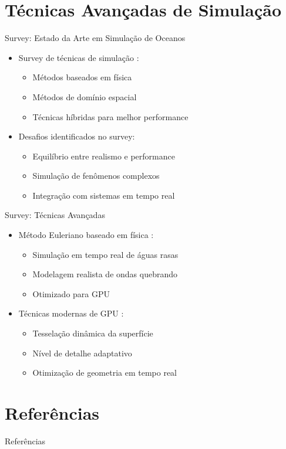 \documentclass[aspectratio=169,xcolor=table]{beamer}
\begin{document}
\section{Técnicas Avançadas de Simulação}
\begin{frame}{Survey: Estado da Arte em Simulação de Oceanos}
    \begin{itemize}
        \item Survey de técnicas de simulação \cite{darles2011survey}:
        \begin{itemize}
            \item Métodos baseados em física
            \item Métodos de domínio espacial
            \item Técnicas híbridas para melhor performance
        \end{itemize}
        \item Desafios identificados no survey:
        \begin{itemize}
            \item Equilíbrio entre realismo e performance
            \item Simulação de fenômenos complexos
            \item Integração com sistemas em tempo real
        \end{itemize}
    \end{itemize}
\end{frame}

\begin{frame}{Survey: Técnicas Avançadas}
    \begin{itemize}
        \item Método Euleriano baseado em física \cite{thurey2007realtime}:
        \begin{itemize}
            \item Simulação em tempo real de águas rasas
            \item Modelagem realista de ondas quebrando
            \item Otimizado para GPU
        \end{itemize}
        \item Técnicas modernas de GPU \cite{bonaventura2018terrain}:
        \begin{itemize}
            \item Tesselação dinâmica da superfície
            \item Nível de detalhe adaptativo
            \item Otimização de geometria em tempo real
        \end{itemize}
    \end{itemize}
\end{frame}

\section{Referências}
\begin{frame}[allowframebreaks]{Referências}
    
    
\end{frame}
\end{document}
